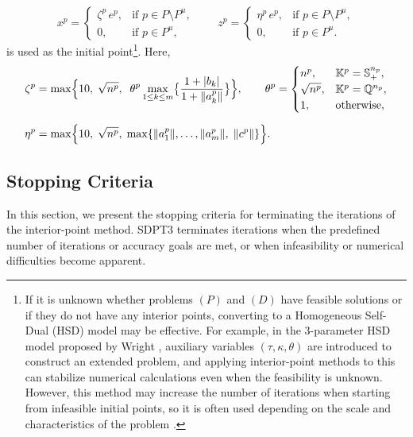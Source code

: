 \[
    x^p = \begin{cases}
        \zeta^p\, e^p, & \text{if } p \in P \setminus P^u,\\
        0, & \text{if } p\in P^u,
    \end{cases}
    \quad
    \quad 
    z^p = \begin{cases}
        \eta^p\, e^p, & \text{if } p \in P \setminus P^u,\\
        0, & \text{if } p\in P^u.
    \end{cases}
\]
is used as the initial point\footnote{If it is unknown whether problems $(P)$ and $(D)$ have feasible solutions or if they do not have any interior points, converting to a Homogeneous Self-Dual (HSD) model may be effective.
For example, in the 3-parameter HSD model proposed by Wright \cite{Wright1997},
auxiliary variables $(\tau, \kappa, \theta)$ are introduced to construct an extended problem, and applying interior-point methods to this can stabilize numerical calculations even when the feasibility is unknown.
However, this method may increase the number of iterations when starting from infeasible initial points, so it is often used depending on the scale and characteristics of the problem \cite{toh1999}.}. Here,
\begin{align*}
    \zeta^p 
    &= \max\Bigl\{
       10,\;\sqrt{n^p},\;\;\theta^p \max_{1 \le k \le m}\bigl\{\frac{1 + |b_k|}{1 + \|a^p_k\|}\bigr\}
      \Bigr\},
    \quad
    \quad
    \theta^p = \begin{cases}
        n^p, & \mathbb{K}^p=\mathbb{S}^{n_p}_+,\\
        \sqrt{n^p}, & \mathbb{K}^p=\mathbb{Q}^{n_p},\\
        1, & \text{otherwise},
    \end{cases}
    \\[6pt]
    \eta^p 
    &= \max\Bigl\{
       10,\;\sqrt{n^p},\;\max\{\|a^p_1\|,\ldots,\|a^p_m\|,\;\|c^p\|\}
      \Bigr\}.
\end{align*}

\medskip
\subsection{Stopping Criteria}
\label{sec:stopping_criteria}

In this section, we present the stopping criteria for terminating the iterations of the interior-point method.
SDPT3 terminates iterations when the predefined number of iterations or accuracy goals are met, or when infeasibility or numerical difficulties become apparent.

